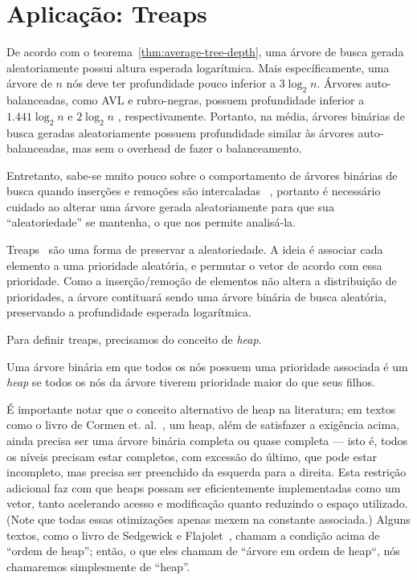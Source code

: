\section{Aplicação: Treaps}

De acordo com o teorema~\ref{thm:average-tree-depth},
uma árvore de busca gerada aleatoriamente
possui altura esperada logarítmica.
Mais específicamente,
uma árvore de $n$ nós
deve ter profundidade pouco inferior a $3 \log_2 n$.
Árvores auto-balanceadas,
como AVL e rubro-negras,
possuem profundidade inferior a $1.441 \log_2 n$ \cite[p.~460]{Knuth1998}
e $2 \log_2 n$ \cite[p.~309]{CormenLeisersonRivestStein2009},
respectivamente.
Portanto,
na média,
árvores binárias de busca geradas aleatoriamente
possuem profundidade similar às árvores auto-balanceadas,
mas sem o overhead de fazer o balanceamento.

Entretanto,
sabe-se muito pouco sobre o comportamento de árvores binárias de busca
quando inserções e remoções são intercaladas%
~\cite[p.~300]{CormenLeisersonRivestStein2009},
portanto é necessário cuidado ao alterar uma árvore gerada aleatoriamente
para que sua ``aleatoriedade'' se mantenha,
o que nos permite analisá-la.

Treaps~\cite{AragonSeidel1989} são uma forma de preservar a aleatoriedade.
A ideia é associar cada elemento a uma prioridade aleatória,
e permutar o vetor de acordo com essa prioridade.
Como a inserção/remoção de elementos
não altera a distribuição de prioridades,
a árvore contituará sendo uma árvore binária de busca aleatória,
preservando a profundidade esperada logarítmica.

Para definir treaps, precisamos do conceito de \emph{heap}.

\begin{definition}
    Uma árvore binária em que todos os nós possuem uma prioridade associada
    é um \emph{heap}
    se todos os nós da árvore tiverem prioridade maior do que seus filhos.
\end{definition}

É importante notar que o conceito alternativo de heap na literatura;
em textos como o livro de Cormen et. al.~\cite[p.~152]{CormenLeisersonRivestStein2009},
um heap, além de satisfazer a exigência acima,
ainda precisa ser uma árvore binária completa ou quase completa
--- isto é, todos os níveis precisam estar completos,
com excessão do último, que pode estar incompleto,
mas precisa ser preenchido da esquerda para a direita.
Esta restrição adicional
faz com que heaps possam ser eficientemente implementadas como um vetor,
tanto acelerando acesso e modificação quanto reduzindo o espaço utilizado.
(Note que todas essas otimizações apenas mexem na constante associada.)
Alguns textos, como o livro de Sedgewick e Flajolet~\cite[p.~362]{SedgewickFlajolet2013},
chamam a condição acima de ``ordem de heap'';
então, o que eles chamam de ``árvore em ordem de heap``,
nós chamaremos simplesmente de ``heap''.

